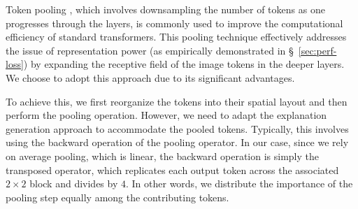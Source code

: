 Token pooling \cite{tokenpooling}, which involves downsampling the number of tokens as one progresses through the layers, is commonly used to improve the computational efficiency of standard transformers. This pooling technique effectively addresses the issue of representation power (as empirically demonstrated in \S~\ref{sec:perf-loss}) by expanding the receptive field of the image tokens in the deeper layers. We choose to adopt this approach due to its significant advantages.

To achieve this, we first reorganize the tokens into their spatial layout and then perform the pooling operation. However, we need to adapt the explanation generation approach to accommodate the pooled tokens. Typically, this involves using the backward operation of the pooling operator. In our case, since we rely on average pooling, which is linear, the backward operation is simply the transposed operator, which replicates each output token across the associated \(2 \times 2\) block and divides by \(4\). In other words, we distribute the importance of the pooling step equally among the contributing tokens.



